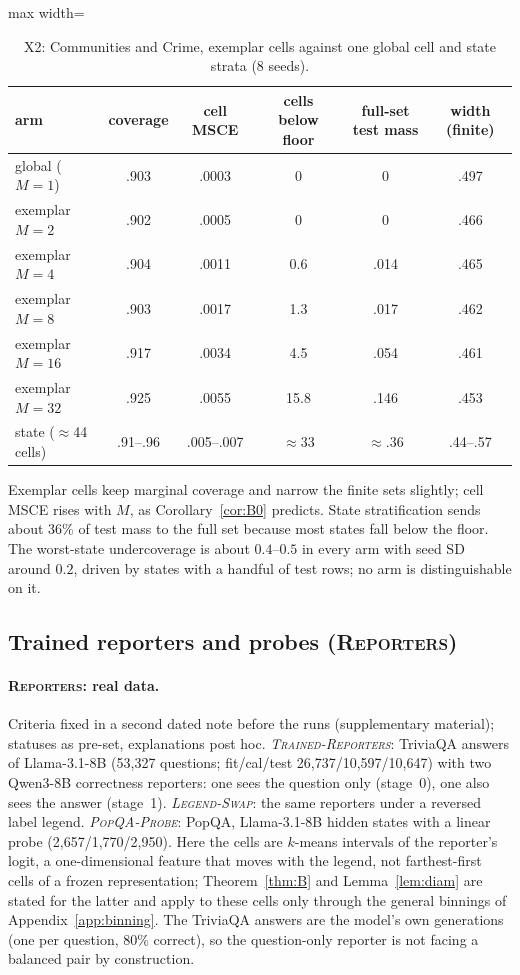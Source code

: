 \documentclass[twoside]{article}
\theoremstyle{definition}
\theoremstyle{remark}
\newcommand{\1}{\mathbf{1}}
\newcommand{\expname}[1]{\textsc{#1}}
\begin{document}
\begin{table}[t]
\caption{X2: Communities and Crime, exemplar cells against one global cell and state strata (8 seeds).}
\centering\small
\begin{adjustbox}{max width=\textwidth}
\begin{tabular}{lccccc}
\toprule
arm & coverage & cell MSCE & cells below floor & full-set test mass & width (finite)\\
\midrule
global ($M{=}1$)  & .903 & .0003 & 0 & 0 & .497\\
exemplar $M{=}2$  & .902 & .0005 & 0 & 0 & .466\\
exemplar $M{=}4$  & .904 & .0011 & 0.6 & .014 & .465\\
exemplar $M{=}8$  & .903 & .0017 & 1.3 & .017 & .462\\
exemplar $M{=}16$ & .917 & .0034 & 4.5 & .054 & .461\\
exemplar $M{=}32$ & .925 & .0055 & 15.8 & .146 & .453\\
state ($\approx$44 cells) & .91--.96 & .005--.007 & $\approx$33 & $\approx$.36 & .44--.57\\
\bottomrule
\end{tabular}
\end{adjustbox}
\end{table}
Exemplar cells keep marginal coverage and narrow the finite sets slightly; cell MSCE rises
with $M$, as Corollary~\ref{cor:B0} predicts. State stratification sends about 36\% of
test mass to the full set because most states fall below the floor. The worst-state
undercoverage is about $0.4$--$0.5$ in every arm with seed SD around $0.2$, driven by states
with a handful of test rows; no arm is distinguishable on it.

\subsection{Trained reporters and probes (\expname{Reporters})}
\paragraph{\expname{Reporters}: real data.} Criteria fixed in a second dated note before the runs
(supplementary material); statuses as pre-set, explanations post hoc.
\emph{\expname{Trained-Reporters}}: TriviaQA answers of Llama-3.1-8B (53{,}327 questions; fit/cal/test
26{,}737/10{,}597/10{,}647) with two Qwen3-8B correctness reporters: one sees the question only
(stage~0), one also sees the answer (stage~1). \emph{\expname{Legend-Swap}}: the same reporters under a reversed
label legend. \emph{\expname{PopQA-Probe}}: PopQA, Llama-3.1-8B hidden states with a linear probe (2{,}657/1{,}770/2{,}950).
Here the cells are $k$-means intervals of the reporter's logit, a one-dimensional feature that moves
with the legend, not farthest-first cells of a frozen representation; Theorem~\ref{thm:B} and
Lemma~\ref{lem:diam} are stated for the latter and apply to these cells only through the general
binnings of Appendix~\ref{app:binning}. The TriviaQA answers are the model's own generations (one per
question, 80\% correct), so the question-only reporter is not facing a balanced pair by construction.
\end{document}
